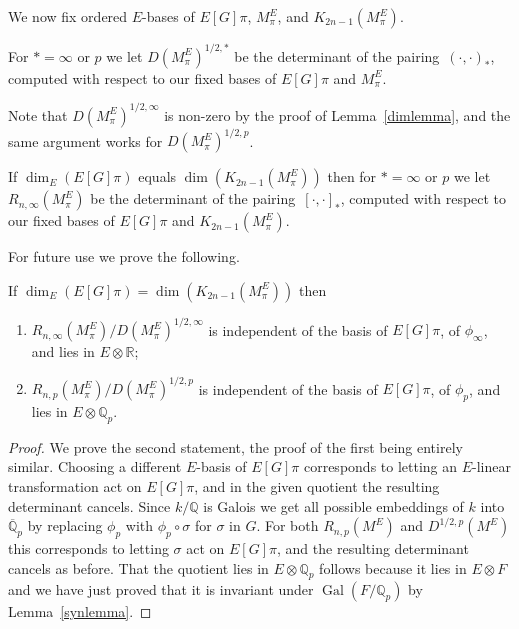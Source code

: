 \documentclass{amsart}
\begin{document}
We now fix ordered $ E $-bases of $ E[G]\pi $, $ M_\pi^E $, and $ {{K_{2n-1}(M_\pi^E)}} $.

\begin{definition}\label{discdef}
For $ *=\infty $ or $ p $
we let $ D(M_\pi^E)^{1/2,*} $ be the determinant of the pairing~$ (\cdot,\cdot)_* $,
computed with respect to our fixed bases of $ E[G]\pi $ and $ M_\pi^E $.
\end{definition}

Note that $ D(M_\pi^E)^{1/2,\infty} $ is non-zero by the proof of Lemma~\ref{dimlemma}, and the same
argument works for $ D(M_\pi^E)^{1/2,p} $.

\begin{definition}\label{regdef}
If $ \dim_E(E[G]\pi) $ equals $ \dim({{K_{2n-1}(M_\pi^E)}}) $ then
for $ *=\infty $ or $ p $
we let $ R_{n,\infty}(M_\pi^E) $ be the determinant of the pairing~$ [\cdot,\cdot]_* $,
computed with respect to our fixed bases of $ E[G]\pi $ and $ {{K_{2n-1}(M_\pi^E)}}$.
\end{definition}

For future use we prove the following.

\begin{lemma}\label{Qpquot}
If $ \dim_E(E[G]\pi) = \dim({{K_{2n-1}(M_\pi^E)}}) $ then
\begin{enumerate}
\item
$ R_{n,\infty}(M_\pi^E) / D(M_\pi^E)^{1/2,\infty} $
is independent of the basis of $ E[G]\pi $, of $ \phi_\infty $, and lies in $ E {\otimes} {\mathbb R} $;
\item
$ R_{n,p}(M_\pi^E) / D(M_\pi^E)^{1/2,p} $
is independent of the basis of $ E[G]\pi $, of $ \phi_p $, and lies in $ E {\otimes} {{\mathbb Q_p}} $.
\end{enumerate}
\end{lemma}

\begin{proof}
We prove the second statement, the proof of the first being entirely similar.
Choosing a different $ E $-basis of $ E[G]\pi $ corresponds to letting an $ E $-linear transformation
act on $ E[G]\pi $, and in the given quotient the resulting determinant cancels.
Since $ k/{\mathbb Q} $ is Galois we get all possible embeddings of $ k $ into $ {{\overline {\mathbb Q}_p}} $ by replacing $ \phi_p $ with $ \phi_p \circ {\sigma} $
for $ {\sigma} $ in $ G $.   For both $ R_{n,p}(M^E) $ and $ D^{1/2,p}(M^E) $ this corresponds to letting $ {\sigma} $ act on $ E[G]\pi $,
and the resulting determinant cancels as before.  That the quotient lies in $ E {\otimes} {{\mathbb Q_p}} $ follows
because it lies in $ E {\otimes} F $ and we have just proved that it is invariant under
$ {\operatorname{Gal}}(F/{{\mathbb Q_p}}) $ by Lemma~\ref{synlemma}.
\end{proof}
\end{document}
